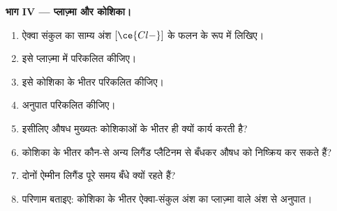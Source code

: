 \begin{problem}
\medskip\noindent\textbf{भाग IV --- प्लाज़्मा और कोशिका।}
\begin{enumerate}[resume]
  \item ऐक्वा संकुल का साम्य अंश
        $[\ce{Cl-}]$ के फलन के रूप में लिखिए।
  \item इसे प्लाज़्मा में परिकलित कीजिए।
  \item इसे कोशिका के भीतर परिकलित कीजिए।
  \item अनुपात परिकलित कीजिए।
  \item इसीलिए औषध मुख्यतः कोशिकाओं के भीतर ही क्यों कार्य करती है?
  \item कोशिका के भीतर कौन-से अन्य लिगैंड प्लैटिनम से बँधकर औषध को
        निष्क्रिय कर सकते हैं?
  \item दोनों ऐम्मीन लिगैंड पूरे समय बँधे क्यों रहते हैं?
  \item परिणाम बताइए: कोशिका के भीतर ऐक्वा-संकुल अंश का
        प्लाज़्मा वाले अंश से अनुपात।
\end{enumerate}
\end{problem}
